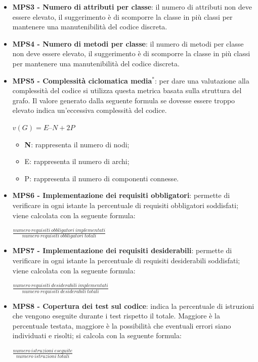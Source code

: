 \documentclass[11pt,a4paper]{article}
\begin{document}
{\begin{itemize}
	    \item \textbf{MPS3 - Numero di attributi per classe}: il numero di attributi non deve essere elevato, il suggerimento è di scomporre la classe in più classi per mantenere una manutenibilità del codice discreta.
	
	    \item \textbf{MPS4 - Numero di metodi per classe}: il numero di metodi per classe non deve essere elevato, il suggerimento è di scomporre la classe in più classi per mantenere una manutenibilità del codice discreta.
	 
	    \item \textbf{MPS5 - Complessità ciclomatica media$^*$}: per dare una valutazione alla complessità del codice si utilizza questa metrica basata sulla struttura del grafo. Il valore generato dalla seguente formula se dovesse essere troppo elevato indica un'eccessiva complessità del codice.
		\begin{center}
		$v(G) = E – N + 2P$
		\end{center}
    	
    	\begin{itemize}
    	    \item \textbf{N}: rappresenta il numero di nodi;
    	    \item E: rappresenta il numero di archi;
    	    \item P: rappresenta il numero di componenti connesse.
    	\end{itemize}
    
		\item \textbf{MPS6 - Implementazione dei requisiti obbligatori}: permette di verificare in ogni istante la percentuale di requisiti obbligatori soddisfati; viene calcolata con la seguente formula: 
		\begin{center}
		$\frac{numero\ requisiti\ obbligatori\ implementati}{numero\ requisiti\ obbligatori\ totali}$
	\end{center}
	
		\item \textbf{MPS7 - Implementazione dei requisiti desiderabili}: permette di verificare in ogni istante la percentuale di requisiti desiderabili soddisfati; viene calcolata con la seguente formula: 
		\begin{center}
		$\frac{numero\ requisiti\ desiderabili\ implementati}{numero\ requisiti\ desiderabili\ totali}$
	\end{center}

		\item \textbf{MPS8 - Copertura dei test sul codice}: indica la percentuale di istruzioni che vengono eseguite durante i test rispetto il totale. Maggiore è la percentuale testata, maggiore è la possibilità che eventuali errori siano individuati e risolti; si calcola con la seguente formula:
		\begin{center}
		$\frac{numero\ istruzioni\ eseguite}{numero\ istruzioni\ totali}$	
		\end{center}


\end{itemize}}
\end{document}
